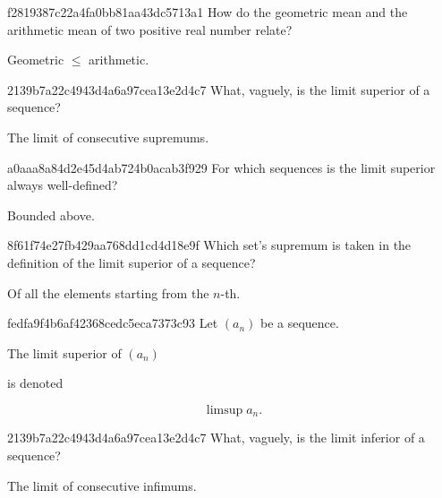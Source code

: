 \begin{note}{f2819387c22a4fa0bb81aa43dc5713a1}
    How do the geometric mean and the arithmetic mean of two positive real number relate?

    \begin{cloze}{1}
        Geometric \({ \leq }\) arithmetic.
    \end{cloze}
\end{note}

\begin{note}{2139b7a22c4943d4a6a97cea13e2d4c7}
    What, vaguely, is the limit superior of a sequence?

    \begin{cloze}{1}
        The limit of consecutive supremums.
    \end{cloze}
\end{note}

\begin{note}{a0aaa8a84d2e45d4ab724b0acab3f929}
    For which sequences is the limit superior always well-defined?

    \begin{cloze}{1}
        Bounded above.
    \end{cloze}
\end{note}

\begin{note}{8f61f74e27fb429aa768dd1cd4d18e9f}
    Which set's supremum is taken in the definition of the limit superior of a sequence?

    \begin{cloze}{1}
        Of all the elements starting from the \({ n }\)-th.
    \end{cloze}
\end{note}

\begin{note}{fedfa9f4b6af42368cedc5eca7373c93}
    Let \({ (a_n) }\) be a sequence.
    \begin{icloze}{2}The limit superior of \({ (a_n) }\)\end{icloze} is denoted
    \begin{icloze}{1}
        \[
            \limsup a_n.
        \]
    \end{icloze}
\end{note}

\begin{note}{2139b7a22c4943d4a6a97cea13e2d4c7}
    What, vaguely, is the limit inferior of a sequence?

    \begin{cloze}{1}
        The limit of consecutive infimums.
    \end{cloze}
\end{note}

